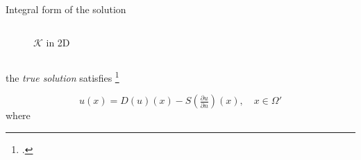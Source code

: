 \documentclass{beamer}
\begin{document}
\begin{frame}{Integral form of the solution}
{\begin{columns}
\begin{column}{0.3\textwidth}
\begin{figure}
\begin{center}
          \end{center}\caption{$\mathcal K$ in 2D}
          \end{figure}
      \end{column}
    \end{columns}

    the \emph{true solution} satisfies          \footcite{Colton_Kress_1998,Kress_1999}

      \begin{equation*}
          u(x) = D(u)(x) - S(\tfrac{\partial u}{\partial n})(x), \quad x \in\Omega'
      \end{equation*}
      where
}
\end{frame}
\end{document}
